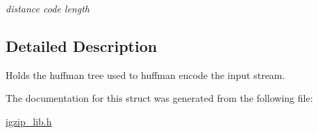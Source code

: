 \begin{DoxyCompactItemize}
\begin{DoxyCompactList}\small\item\em distance code length \end{DoxyCompactList}\end{DoxyCompactItemize}


\subsection{Detailed Description}
Holds the huffman tree used to huffman encode the input stream. 

The documentation for this struct was generated from the following file\-:\begin{DoxyCompactItemize}
\item 
\hyperlink{igzip__lib_8h}{igzip\-\_\-lib.\-h}\end{DoxyCompactItemize}
